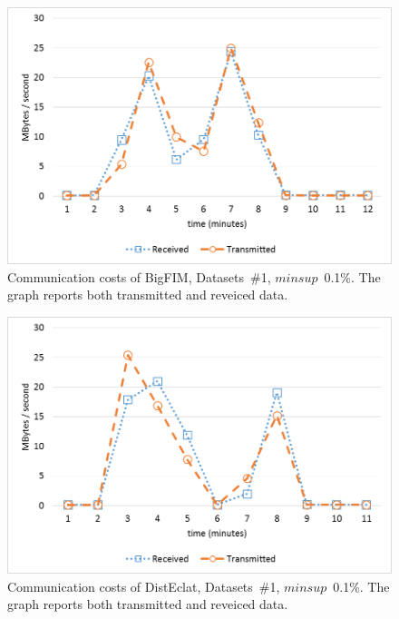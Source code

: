 \begin{figure}[!t]
\begin{center}
\includegraphics[width=5in]{chapters/survey/immagini/comm_costs_bigfim.png}
\caption{Communication costs of BigFIM, Datasets~\#1, $minsup$~0.1\%.
The graph reports both transmitted and reveiced data.}
\label{comm_costs_bigfim}
\end{center}
\end{figure}

\begin{figure}[!t]
\begin{center}
\includegraphics[width=5in]{chapters/survey/immagini/comm_costs_disteclat.png}
\caption{Communication costs of DistEclat, Datasets~\#1, $minsup$~0.1\%.
The graph reports both transmitted and reveiced data.}
\label{comm_costs_disteclat}
\end{center}
\end{figure}


